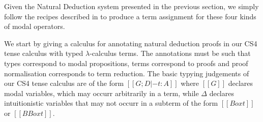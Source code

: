 Given the Natural Deduction system presented in the previous section,
we simply follow the recipes described in \cite{barber1997} to produce
a term assignment for these four kinds of modal operators.

We start by giving a calculus for annotating natural deduction proofs
in our CS4 tense calculus with typed $\lambda$-calculus terms. The
annotations must be such that types correspond to modal propositions,
terms correspond to proofs and proof normalisation corresponds to term
reduction. The basic typying judgements of our CS4 tense calculus are
of the form $[[G ; D |- t : A]]$ where $[[G]]$ declares modal
variables, which may occurr arbitrarily in a term, while $\Delta$
declares intuitionistic variables that may not occurr in a subterm of
the form $[[Box t]]$ or $[[BBox t]]$.

